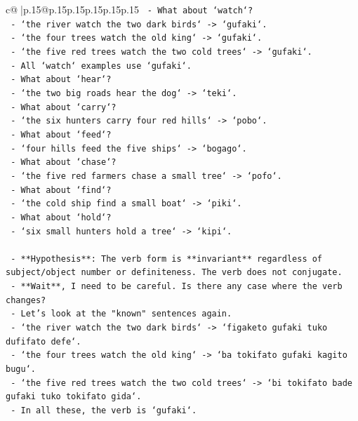 \documentclass{article}
\begin{document}
{\begin{supertabular}{c@{$\;$}|p{.15\linewidth}@{}p{.15\linewidth}p{.15\linewidth}p{.15\linewidth}p{.15\linewidth}p{.15\linewidth}}
{{{\texttt{   {-} What about `watch`?} \\
\texttt{     {-} `the river watch the two dark birds` {-}> `gufaki`.} \\
\texttt{     {-} `the four trees watch the old king` {-}> `gufaki`.} \\
\texttt{     {-} `the five red trees watch the two cold trees` {-}> `gufaki`.} \\
\texttt{   {-} All `watch` examples use `gufaki`.} \\
\texttt{   {-} What about `hear`?} \\
\texttt{     {-} `the two big roads hear the dog` {-}> `teki`.} \\
\texttt{   {-} What about `carry`?} \\
\texttt{     {-} `the six hunters carry four red hills` {-}> `pobo`.} \\
\texttt{   {-} What about `feed`?} \\
\texttt{     {-} `four hills feed the five ships` {-}> `bogago`.} \\
\texttt{   {-} What about `chase`?} \\
\texttt{     {-} `the five red farmers chase a small tree` {-}> `pofo`.} \\
\texttt{   {-} What about `find`?} \\
\texttt{     {-} `the cold ship find a small boat` {-}> `piki`.} \\
\texttt{   {-} What about `hold`?} \\
\texttt{     {-} `six small hunters hold a tree` {-}> `kipi`.} \\
\\ 
\texttt{   {-} **Hypothesis**: The verb form is **invariant** regardless of subject/object number or definiteness. The verb does not conjugate.} \\
\texttt{   {-} **Wait**, I need to be careful. Is there any case where the verb changes?} \\
\texttt{   {-} Let's look at the "known" sentences again.} \\
\texttt{   {-} `the river watch the two dark birds` {-}> `figaketo gufaki tuko dufifato defe`.} \\
\texttt{   {-} `the four trees watch the old king` {-}> `ba tokifato gufaki kagito bugu`.} \\
\texttt{   {-} `the five red trees watch the two cold trees` {-}> `bi tokifato bade gufaki tuko tokifato gida`.} \\
\texttt{   {-} In all these, the verb is `gufaki`.} \\
}}}
\end{supertabular}}
\end{document}
